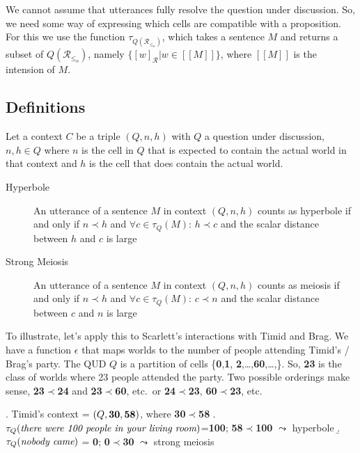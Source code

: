 \documentclass[a4paper,12pt,twoside]{article}
\begin{document}
We cannot assume that utterances fully resolve the question under discussion. So, we need some way of expressing which cells are compatible with a proposition. For this we use the function \(\tau_{Q(\mathcal{R}_{\leq_o})}\), which takes a sentence \(M\) and returns a subset of \(Q(\mathcal{R}_{\leq_o})\), namely \(\{[w]_{\mathcal{R}}|w\in[\![M]\!]\}\), where \([\![ M]\!]\) is the intension of \(M\). 

\subsection{Definitions}

Let a context \(C\) be a triple \((Q,n,h)\) with $Q$ a question under discussion, \(n,h\in Q\) where \(n\) is the cell in \( Q\) that is expected to contain the actual world in that context and \(h\) is the cell that does contain the actual world. 

\begin{description}
\item[{Hyperbole}] An utterance of a sentence \(M\) in context \(( Q,n,h)\) counts as hyperbole if and only if  \(n\prec h\) and \(\forall c\in\tau_{ Q}(M)\): \(h\prec c\) and the scalar distance between \(h\) and \(c\) is large  
\end{description}

\begin{description}
\item[{Strong Meiosis}] An utterance of a sentence \(M\) in context \(( Q,n,h)\) counts as meiosis if and only if \(n\prec h\) and \(\forall c\in\tau_{ Q}(M)\): \(c\prec n\) and the scalar distance between \(c\) and \(n\) is large 
\end{description}

To illustrate, let's apply this to Scarlett's interactions with  Timid and Brag. We have a function $\epsilon$ that maps worlds to the number of people attending Timid's / Brag's party. The QUD $Q$ is a partition of cells \{{\bf 0},{\bf 1}, {\bf 2},\ldots,{\bf 60},\ldots,\}. So, {\bf 23} is the class of worlds where 23 people attended the party.  Two possible orderings make sense, {\bf 23}$\prec${\bf 24} and {\bf 23}$\prec${\bf 60}, etc.~or {\bf 24}$\prec${\bf 23}, {\bf 60}$\prec${\bf 23}, etc.

\ex. Timid's context = $(Q,\mbox{\bf 30},\mbox{\bf 58})$, where {\bf 30}$\prec${\bf 58}
\a. $\tau_Q(\mbox{\em there were 100 people in your living room})$={\bf 100}; {\bf 58}$\prec${\bf 100} $\leadsto$ hyperbole
\b. $\tau_Q(\mbox{\em nobody came})$ = {\bf 0}; {\bf 0}$\prec${\bf 30} $\leadsto$ strong meiosis
\end{document}
